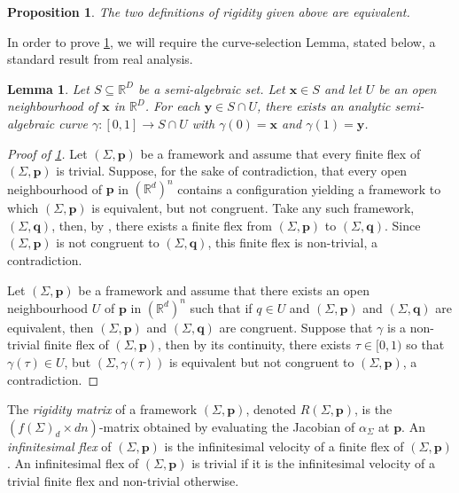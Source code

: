 \documentclass[11pt]{amsart}
\newtheorem{proposition}[theorem]{Proposition}
\newtheorem{lemma}[theorem]{Lemma}
\theoremstyle{definition}
\theoremstyle{remark}
\newcommand*{\defn}[1]{{\color{purple}\textit{#1}}}
\begin{document}
\begin{proposition}\label{prop:rigeq}
    The two definitions of rigidity given above are equivalent.
\end{proposition}

In order to prove \cref{prop:rigeq}, we will require the curve-selection Lemma, stated below, a standard result from real analysis.

\begin{lemma}\label{lem:CSL}\cite{milnor}
    Let $S\subseteq\mathbb{R}^D$ be a semi-algebraic set.
    Let $\mathbf{x}\in S$ and let $U$ be an open neighbourhood of $\mathbf{x}$ in $\mathbb{R}^D$.
    For each $\mathbf{y}\in S\cap U$, there exists an analytic semi-algebraic curve $\gamma:[0,1]\rightarrow S\cap U$ with $\gamma(0)=\mathbf{x}$ and $\gamma(1)=\mathbf{y}$.
\end{lemma}

\begin{proof}[Proof of \cref{prop:rigeq}]
    Let $(\Sigma,\mathbf{p})$ be a framework and assume that every finite flex of $(\Sigma,\mathbf{p})$ is trivial.
    Suppose, for the sake of contradiction, that every open neighbourhood of $\mathbf{p}$ in $(\mathbb{R}^d)^n$ contains a configuration yielding a framework to which $(\Sigma,\mathbf{p})$ is equivalent, but not congruent.
    Take any such framework, $(\Sigma,\mathbf{q})$, then, by , there exists a finite flex from $(\Sigma,\mathbf{p})$ to $(\Sigma,\mathbf{q})$.
    Since $(\Sigma,\mathbf{p})$ is not congruent to $(\Sigma,\mathbf{q})$, this finite flex is non-trivial, a contradiction.

    Let $(\Sigma,\mathbf{p})$ be a framework and assume that there exists an open neighbourhood $U$ of $\mathbf{p}$ in $(\mathbb{R}^d)^n$ such that if $q\in U$ and $(\Sigma,\mathbf{p})$ and $(\Sigma,\mathbf{q})$ are equivalent, then $(\Sigma,\mathbf{p})$ and $(\Sigma,\mathbf{q})$ are congruent.
    Suppose that $\gamma$ is a non-trivial finite flex of $(\Sigma,\mathbf{p})$, then by its continuity, there exists $\tau\in[0,1)$ so that $\gamma(\tau)\in U$, but $(\Sigma,\gamma(\tau))$ is equivalent but not congruent to $(\Sigma,\mathbf{p})$, a contradiction.
\end{proof}

The \defn{rigidity matrix} of a framework $(\Sigma,\mathbf{p})$, denoted $R(\Sigma,\mathbf{p})$, is the $(f(\Sigma)_d\times dn)$-matrix obtained by evaluating the Jacobian of $\alpha_{\Sigma}$ at $\mathbf{p}$.
An \defn{infinitesimal flex} of $(\Sigma,\mathbf{p})$ is the infinitesimal velocity of a finite flex of $(\Sigma,\mathbf{p})$.
An infinitesimal flex of $(\Sigma,\mathbf{p})$ is trivial if it is the infinitesimal velocity of a trivial finite flex and non-trivial otherwise.
\end{document}
